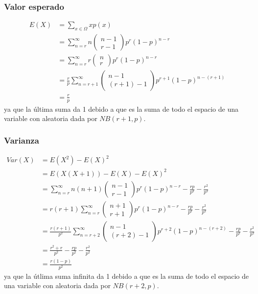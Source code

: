 \documentclass{article}
\begin{document}
\begin{tcolorbox}[breakable]
    \subsubsection*{Valor esperado}
    \begin{align*}
        E(X) 
        &= \sum_{x \in \Omega} xp(x) \\
        &= \sum_{n=r}^\infty n\left( \begin{matrix} n-1 \\ r-1 \end{matrix} \right)p^r(1-p)^{n-r} \\
        &= \sum_{n=r}^\infty r\left( \begin{matrix} n \\ r \end{matrix} \right)p^r(1-p)^{n-r} \\  
        &= \frac{r}{p}\sum_{n=r+1}^\infty \left( \begin{matrix} n-1 \\ (r+1)-1 \end{matrix} \right)p^{r+1}(1-p)^{n-(r+1)} \\
        &= \frac{r}{p}
    \end{align*}
    ya que la última suma da 1 debido a que es la suma de todo el espacio de una variable con aleatoria dada por $NB(r+1,p)$.
    \subsubsection*{Varianza}
    \begin{align*}
        Var(X) 
        &= E(X^2)-E(X)^2 \\
        &= E(X(X+1))-E(X)-E(X)^2 \\
        &= \sum_{n=r}^\infty n(n+1)\left( \begin{matrix} n-1 \\ r-1 \end{matrix} \right)p^r(1-p)^{n-r}
        -\frac{rp}{p^2} - \frac{r^2}{p^2} \\
        &= r(r+1) \sum_{n=r}^\infty \left( \begin{matrix} n+1 \\ r+1 \end{matrix} \right)p^r(1-p)^{n-r} 
        -\frac{rp}{p^2} - \frac{r^2}{p^2} \\
        &= \frac{r(r+1)}{p^2} \sum_{n=r+2}^\infty \left( \begin{matrix} n-1 \\ (r+2)-1 \end{matrix} \right)p^{r+2}(1-p)^{n-(r+2)}
        -\frac{rp}{p^2} - \frac{r^2}{p^2} \\
        &= \frac{r^2+r}{p^2}-\frac{rp}{p^2} - \frac{r^2}{p^2} \\
        &= \frac{r(1-p)}{p^2}
    \end{align*}
    ya que la útlima suma infinita da 1 debido a que es la suma de todo el espacio de una variable con aleatoria dada por $NB(r+2,p)$.

\end{tcolorbox}
\end{document}
